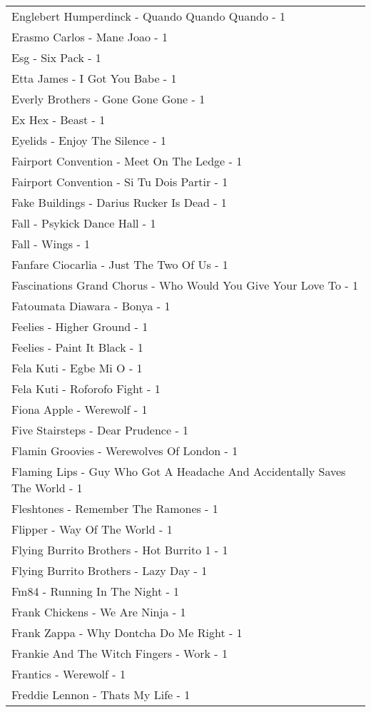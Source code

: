 \documentclass[
]{article}
\begin{document}
\begin{longtable}{l}
Englebert Humperdinck - Quando Quando Quando - 1 \\ 
Erasmo Carlos - Mane Joao - 1 \\ 
Esg - Six Pack - 1 \\ 
Etta James - I Got You Babe - 1 \\ 
Everly Brothers - Gone Gone Gone - 1 \\ 
Ex Hex - Beast - 1 \\ 
Eyelids - Enjoy The Silence - 1 \\ 
Fairport Convention - Meet On The Ledge - 1 \\ 
Fairport Convention - Si Tu Dois Partir - 1 \\ 
Fake Buildings - Darius Rucker Is Dead - 1 \\ 
Fall - Psykick Dance Hall - 1 \\ 
Fall - Wings - 1 \\ 
Fanfare Ciocarlia - Just The Two Of Us - 1 \\ 
Fascinations Grand Chorus - Who Would You Give Your Love To - 1 \\ 
Fatoumata Diawara - Bonya - 1 \\ 
Feelies - Higher Ground - 1 \\ 
Feelies - Paint It Black - 1 \\ 
Fela Kuti - Egbe Mi O - 1 \\ 
Fela Kuti - Roforofo Fight - 1 \\ 
Fiona Apple - Werewolf - 1 \\ 
Five Stairsteps - Dear Prudence - 1 \\ 
Flamin Groovies - Werewolves Of London - 1 \\ 
Flaming Lips - Guy Who Got A Headache And Accidentally Saves The World - 1 \\ 
Fleshtones - Remember The Ramones - 1 \\ 
Flipper - Way Of The World - 1 \\ 
Flying Burrito Brothers - Hot Burrito 1 - 1 \\ 
Flying Burrito Brothers - Lazy Day - 1 \\ 
Fm84 - Running In The Night - 1 \\ 
Frank Chickens - We Are Ninja - 1 \\ 
Frank Zappa - Why Dontcha Do Me Right - 1 \\ 
Frankie And The Witch Fingers - Work - 1 \\ 
Frantics - Werewolf - 1 \\ 
Freddie Lennon - Thats My Life - 1 \\ 

\end{longtable}
\end{document}
